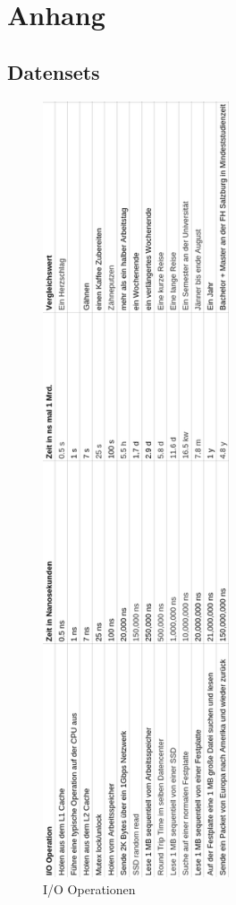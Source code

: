 \section*{Anhang}

\subsection*{Datensets}

\begin{figure}[!htb]
  \centering
  \includegraphics[width=5.5cm]{images/io_operations.png}
  \caption{
    I/O Operationen
  }
  \label{figure:syncron_vs_async}
\end{figure}

